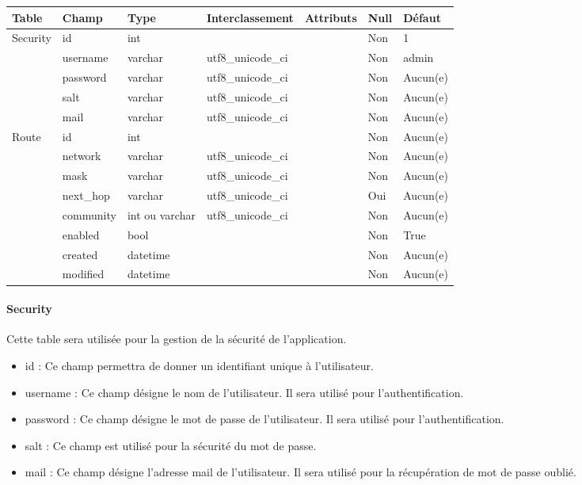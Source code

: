 \begin{tabular}{|l|l|l|l|l|l|l|}
   \hline
    Table & Champ & Type & Interclassement & Attributs & Null & Défaut \\
    \hline
        Security & id & int &  &  & Non & 1 \\
    \cline{2-7}
         & username & varchar & utf8\_unicode\_ci & & Non & admin \\
    \cline{2-7}
         & password & varchar & utf8\_unicode\_ci & & Non & Aucun(e) \\
    \cline{2-7}
         & salt & varchar & utf8\_unicode\_ci & & Non & Aucun(e) \\
    \cline{2-7}
         & mail & varchar & utf8\_unicode\_ci & & Non & Aucun(e) \\
    \hline
        Route & id & int &  &  & Non & Aucun(e)\\
    \cline{2-7}
         & network & varchar & utf8\_unicode\_ci & & Non & Aucun(e) \\
    \cline{2-7}
         & mask & varchar & utf8\_unicode\_ci & & Non & Aucun(e) \\
    \cline{2-7}
         & next\_hop & varchar & utf8\_unicode\_ci & & Oui & Aucun(e) \\
    \cline{2-7}
         & community & int ou varchar & utf8\_unicode\_ci & & Non & Aucun(e) \\
    \cline{2-7}
         & enabled & bool &  & & Non & True \\
    \cline{2-7}
         & created & datetime &  & & Non & Aucun(e) \\
    \cline{2-7}
         & modified & datetime &  & & Non & Aucun(e) \\
    \hline
\end{tabular}

\paragraph{Security} Cette table sera utilisée pour la gestion de la sécurité de l'application.
\begin{itemize}
    \item id : Ce champ permettra de donner un identifiant unique à l'utilisateur.
    \item username : Ce champ désigne le nom de l'utilisateur. Il sera utilisé pour l'authentification.
    \item password : Ce champ désigne le mot de passe de l'utilisateur. Il sera utilisé pour l'authentification.
    \item salt : Ce champ est utilisé pour la sécurité du mot de passe.
    \item mail : Ce champ désigne l'adresse mail de l'utilisateur. Il sera utilisé pour la récupération de mot de passe oublié.
\end{itemize}

